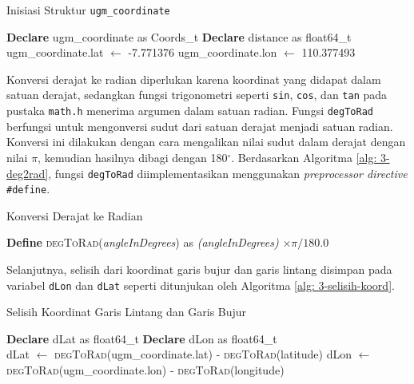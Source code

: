 \begin{algorithm}[H]
	\caption{Inisiasi Struktur \texttt{ugm\_coordinate}}
	\label{alg: 3-define-geof}
	\begin{algorithmic}[1]
	\State \textbf{Declare} ugm\_coordinate as Coords\_t
	\State \textbf{Declare} distance as float64\_t
	\\
	\State ugm\_coordinate.lat $\gets$ -7.771376
	\State ugm\_coordinate.lon $\gets$ 110.377493		
	\end{algorithmic}
\end{algorithm}

Konversi derajat ke radian diperlukan karena koordinat yang didapat dalam satuan derajat, sedangkan fungsi trigonometri seperti \texttt{sin}, \texttt{cos}, dan \texttt{tan} pada pustaka \texttt{math.h} menerima argumen dalam satuan radian. Fungsi  \texttt{degToRad} berfungsi untuk mengonversi sudut dari satuan derajat menjadi satuan radian. Konversi ini dilakukan dengan cara mengalikan nilai sudut dalam derajat dengan nilai $\pi$, kemudian hasilnya dibagi dengan 180$^{\circ}$. Berdasarkan Algoritma \ref{alg: 3-deg2rad}, fungsi \texttt{degToRad} diimplementasikan menggunakan \textit{preprocessor directive} \texttt{\#define}.

\begin{algorithm}[H]
	\caption{Konversi Derajat ke Radian}
	\label{alg: 3-deg2rad}
	\begin{algorithmic}[1]
	\State \textbf{Define} \textsc{degToRad}(\textit{angleInDegrees}) as \textit{(angleInDegrees)} $\times \pi / 180.0$
	\end{algorithmic}
\end{algorithm}

Selanjutnya, selisih dari koordinat garis bujur dan garis lintang disimpan pada variabel \texttt{dLon} dan \texttt{dLat} seperti ditunjukan oleh Algoritma \ref{alg: 3-selisih-koord}.

\begin{algorithm}[H]
	\caption{Selisih Koordinat Garis Lintang dan Garis Bujur}
	\label{alg: 3-selisih-koord}
	\begin{algorithmic}[1]
	\State \textbf{Declare} dLat as float64\_t
	\State \textbf{Declare} dLon as float64\_t
	\\
	\State dLat $\gets$ \textsc{degToRad}(ugm\_coordinate.lat) - \textsc{degToRad}(latitude)
	\State dLon $\gets$ \textsc{degToRad}(ugm\_coordinate.lon) - \textsc{degToRad}(longitude)		
	\end{algorithmic}
\end{algorithm}

